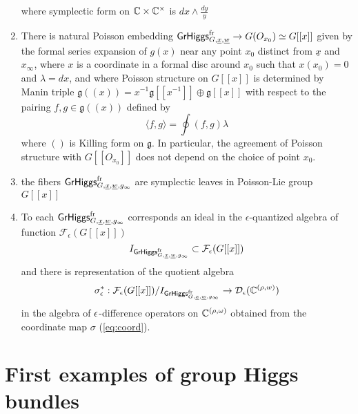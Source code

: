 \documentclass[12pt,psamsfonts,reqno]{amsart}
\begin{document}
\begin{proposition}
\begin{enumerate}
   where symplectic form on $\mathbb C \times \mathbb C^{\times}$ is $dx \wedge \frac{dy}{y}$ 
 \item There is natural Poisson embedding $\mathsf{GrHiggs}_{G,\underline{x}, \underline{w}}^{\mathrm{fr}} \to
   G(O_{x_0})\simeq G[[x]]$ given by the formal series expansion of $g(x)$ near any point $x_0$
distinct from $\underline{x}$ and $x_\infty$,
where $x$ is a coordinate in a formal disc around $x_0$ such that $x(x_0) = 0$
and  $\lambda = d x$, and where Poisson structure on $G[[x]]$
   is determined by Manin triple $\mathfrak{g}((x)) =
   x^{-1} \mathfrak{g}[[x^{-1}]] \oplus \mathfrak{g}[[x]]$
   with respect to the pairing $f,g \in \mathfrak{g}((x))$ defined by
   \begin{equation} 
     \langle f ,g \rangle  = \oint  ( f,  g) \lambda
   \end{equation}
   where $()$ is Killing form on $\mathfrak{g}$. In particular,
   the agreement of Poisson structure with $G[[O_{x_0}]]$ does not depend on the choice of point $x_0$.
 \item the fibers $\mathsf{GrHiggs}_{G,\underline{x}, \underline{w}, g_\infty}^{\mathrm{fr}}$ are symplectic leaves
   in Poisson-Lie group $G[[x]]$
 \item To each $\mathsf{GrHiggs}_{G,\underline{x}, \underline{w}, g_\infty}^{\mathrm{fr}}$
   corresponds an ideal in the $\epsilon$-quantized algebra of function $\mathcal{F}_\epsilon(G[[x]])$
   \begin{equation}
     I_{\mathsf{GrHiggs}_{G,\underline{x}, \underline{w}, g_\infty}^{\mathrm{fr}}} \subset \mathcal{F}_\epsilon(G[[x]])
   \end{equation}
   and there is representation  of the quotient algebra
   \begin{equation}
  \sigma_{\epsilon}^{*}:    \mathcal{F}_\epsilon(G[[x]])/     I_{\mathsf{GrHiggs}_{G,\underline{x}, \underline{w}, g_\infty}^{\mathrm{fr}}} \to \mathcal{D}_{\epsilon}( \mathbb C^{(\rho, w)})
\end{equation}
in the algebra of $\epsilon$-difference operators on $\mathbb C^{(\rho,\omega)}$ obtained from the coordinate
map $\sigma$ (\ref{eq:coord}). 

 

  \end{enumerate}
\end{proposition}

  



\section{First examples of group Higgs bundles}
\end{document}
